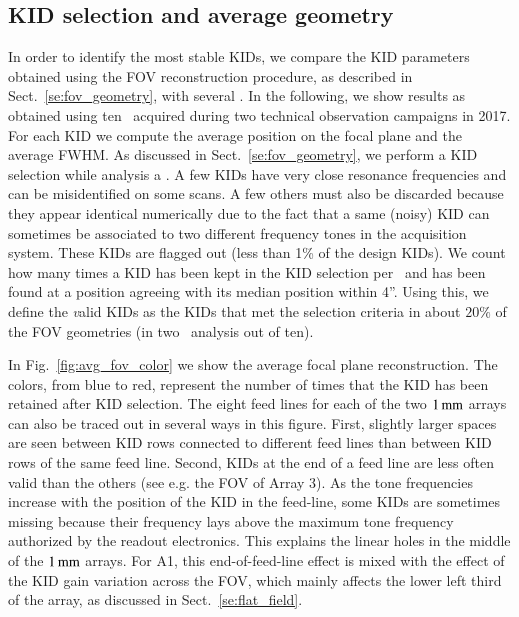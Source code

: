 \subsection{KID selection and average geometry}
\label{se:avg_kidpar}

In order to identify the most stable KIDs, we compare the KID parameters
obtained using the FOV reconstruction procedure, as described in
Sect.~\ref{se:fov_geometry}, with several \bms. In the following, we
show results as obtained using {\lp ten} \bms\ acquired during two
technical observation campaigns in 2017.
For each KID we compute the average position on the focal plane and
the average FWHM. 
As discussed in Sect.~\ref{se:fov_geometry}, we perform a KID
selection while analysis a \bms. A few KIDs have very close resonance
frequencies and can be misidentified on some scans. A few others must
also be discarded because they appear identical
numerically due to the fact that a same (noisy) KID can sometimes be
associated to two different frequency tones in the acquisition system.
These KIDs are flagged out (less than 1\% of the design KIDs).
{\lp We count how many times a KID has been kept in
the KID selection per \bm\ and has been found at a position agreeing
with its median position within 4''.}
Using this, we define the {\emph valid} KIDs as the KIDs that met the selection
criteria in about {\lp $20\%$} of the FOV geometries (in two \bm\
analysis out of ten).

In Fig.~\ref{fig:avg_fov_color} we show the average focal plane
reconstruction. The colors, from blue to red,
represent the number of times that the KID has been retained after
KID selection. The eight feed lines for each of the two
$1\,\rm{mm}$ arrays {\lp can also be traced out in several ways} in this
figure. First, slightly larger spaces are seen between KID rows
connected to different feed lines than between KID rows of the same
feed line. Second, KIDs at the end of a feed line are less often valid
than the others
(see e.g. the FOV of Array 3). As the tone frequencies
increase with the position of the KID in the feed-line, some KIDs are
sometimes missing because their frequency lays above the maximum tone
frequency authorized by the readout electronics. This explains the
linear holes in the middle of the $1\,\rm{mm}$ arrays. For A1, this
end-of-feed-line effect is mixed with the effect of the KID gain
variation across the FOV, which mainly affects the lower left third of
the array, as discussed in Sect.~\ref{se:flat_field}.


